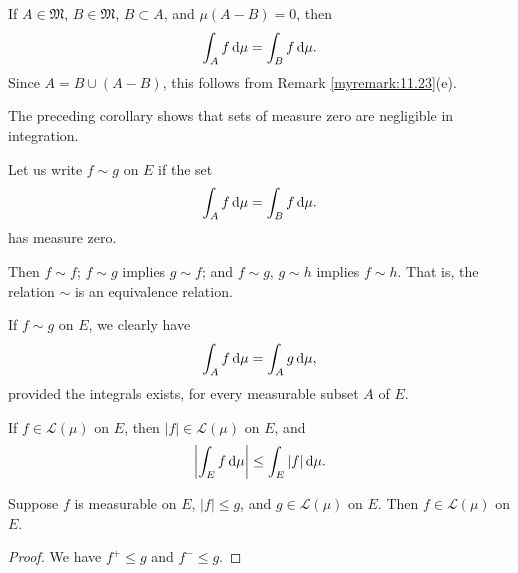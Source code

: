 \begin{myCorollary*}
    If $A \in \mathfrak{M}$, $B \in \mathfrak{M}$, $B \subset A$, and $\mu(A-B)=0$, then
    \begin{equation*}
        \int_A f \d \mu =
        \int_B f \d \mu .
    \end{equation*}
    Since $A =B\cup (A - B)$, this follows from Remark \ref{myremark:11.23}(e).
\end{myCorollary*}

\begin{myremark}
    \label{myremark:11.25}
    The preceding corollary shows that sets of measure zero are negligible in integration.

    Let us write $f \sim g$ on $E$ if the set
    \begin{equation*}
        \int_A f \d \mu =
        \int_B f \d \mu .
    \end{equation*}
    has measure zero.

    Then $f \sim f$; $f \sim g$ implies $g \sim f$;
    and  $f \sim g$, $g \sim h$ implies $f \sim h$.
    That is, the relation $\sim$ is an equivalence relation.

    If $f \sim g$ on $E$, we clearly have
    \begin{equation*}
        \int_A f \d \mu =
        \int_A g \d \mu ,
    \end{equation*}
    provided the integrals exists, for every measurable subset $A$ of $E$.
\end{myremark}

\begin{thm}
    \label{thm:11.26}
    If $f \in \mathscr{L}(\mu)$ on $E$, then $\left| f \right| \in \mathscr{L}(\mu)$ on $E$, and
    \begin{equation}
        \label{eq:11.63}
        \left| \int_E f \d \mu \right| \leq
        \int_E \left| f \right| \d \mu .
    \end{equation}
\end{thm}

\begin{thm}
    \label{thm:11.27}
    Suppose $f$ is measurable on $E$, $\left| f \right| \leq g$, and $g \in \mathscr{L}(\mu)$ on $E$.
    Then $f \in \mathscr{L}(\mu)$ on $E$.
\end{thm}

\begin{proof}
    We have $f^+ \leq g$ and $f^- \leq g$.
\end{proof}

